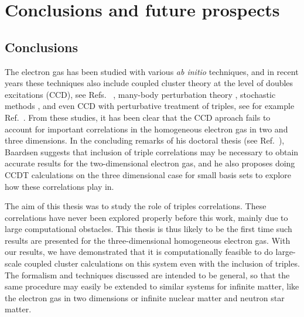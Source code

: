 
\chapter{Conclusions and future prospects} %

\label{Chapter9} %



\section{Conclusions}

The electron gas has been studied with various {\em ab initio}
techniques, and in recent years these techniques also include coupled
cluster theory at the level of doubles excitations (CCD), see Refs.~ \cite{Baardsen2014,
  Shepherd2012}, many-body perturbation theory \cite{Shepherd2013}, stochastic methods \cite{Shepherd2012, Roggero2013, Leikanger2013}, and even CCD
with perturbative treatment of triples, see for example
Ref.~\cite{Shepherd2013}. From these studies, it has been clear that
the CCD aproach fails to account for important correlations in the homogeneous
electron gas in two and three dimensions. In the concluding remarks of
his doctoral thesis (see Ref.~\cite{Baardsen2014}), Baardsen suggests
that inclusion of triple correlations may be necessary to obtain
accurate results for the two-dimensional electron gas, and he also
proposes doing CCDT calculations on the three dimensional case for
small basis sets to explore how these correlations play in.

The aim of this thesis was to study the role of triples
correlations. These correlations have never been explored properly
before this work, mainly due to large computational obstacles.  This
thesis is thus likely to be the first time such results are presented
for the three-dimensional homogeneous electron gas. With our
results, we have demonstrated that it is computationally feasible to do
large-scale coupled cluster calculations on this system even with the
inclusion of triples. The formalism and techniques discussed are
intended to be general, so that the same procedure may easily be
extended to similar systems for infinite matter, like the electron gas in two dimensions or infinite nuclear matter and 
neutron star matter.

